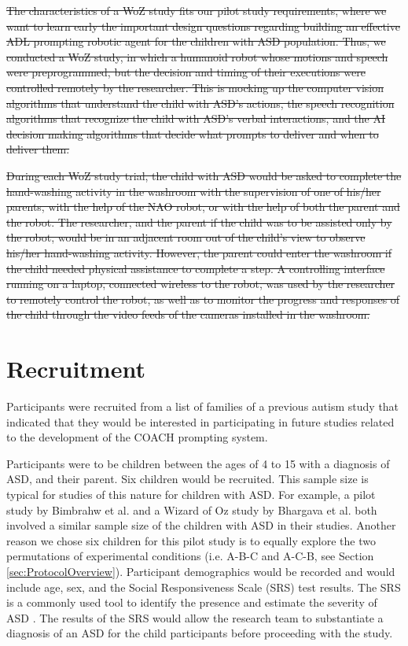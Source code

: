 \documentclass{ut-thesis}
\providecommand{\DIFdeltex}[1]{{\protect\color{red}\sout{#1}}}                      %
\providecommand{\DIFdelend}{} %
\providecommand{\DIFdel}[1]{\texorpdfstring{\DIFdeltex{#1}}{}} %
\begin{document}
\DIFdel{The characteristics of a WoZ study fits our pilot study requirements, where we want to learn early the important design questions regarding building an effective ADL prompting robotic agent for the children with ASD population.  Thus, we conducted a WoZ study, in which a humanoid robot whose motions and speech were preprogrammed, but the decision and timing of their executions were controlled remotely by the researcher.  This is mocking up the computer vision algorithms that understand the child with ASD's actions, the speech recognition algorithms that recognize the child with ASD's verbal interactions, and the AI decision making algorithms that decide what prompts to deliver and when to deliver them.
}%

\DIFdel{During each WoZ study trial, the child with ASD would be asked to complete the hand-washing activity in the washroom with the supervision of one of his/her parents, with the help of the NAO robot, or with the help of both the parent and the robot. The researcher, and the parent if the child was to be assisted only by the robot, would be in an adjacent room out of the child's view to observe his/her hand-washing activity.  However, the parent could enter the washroom if the child needed physical assistance to complete a step. A controlling interface running on a laptop, connected wireless to the robot, was used by the researcher to remotely control the robot, as well as to monitor the progress and responses of the child through the video feeds of the cameras installed in the washroom.
}%

\DIFdelend %
\section{Recruitment}

Participants were recruited from a list of families of a previous autism study that indicated that they would be interested in participating in future studies related to the development of the COACH prompting system.

Participants were to be children between the ages of 4 to 15 with a diagnosis of ASD, and their parent. Six children would be recruited. This sample size is typical for studies of this nature for children with ASD. For example, a pilot study by Bimbrahw et al. \cite{bimbrahw2012investigating} and a Wizard of Oz study by Bhargava et al. \cite{bhargava2013demonstration} both involved a similar sample size of the children with ASD in their studies. Another reason we chose six children for this pilot study is to equally explore the two permutations of experimental conditions (i.e. A-B-C and A-C-B, see Section \ref{sec:ProtocolOverview}). Participant demographics would be recorded and would include age, sex, and the Social Responsiveness Scale (SRS) test results.  The SRS is a commonly used tool to identify the presence and estimate the severity of ASD \cite{constantino2002social}. The results of the SRS would allow the research team to substantiate a diagnosis of an ASD for the child participants before proceeding with the study.
\end{document}
